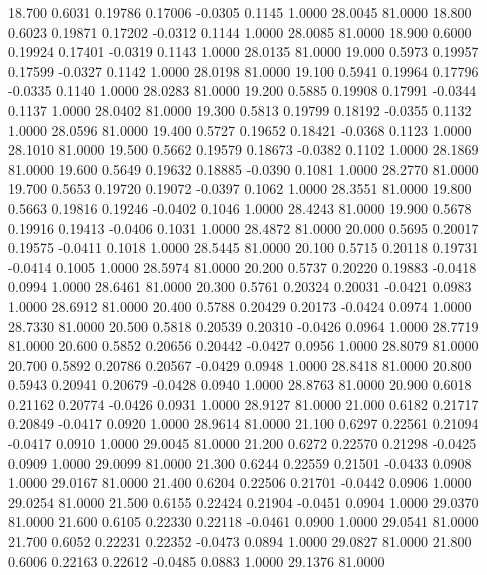   18.700   0.6031   0.19786   0.17006  -0.0305   0.1145   1.0000  28.0045  81.0000
  18.800   0.6023   0.19871   0.17202  -0.0312   0.1144   1.0000  28.0085  81.0000
  18.900   0.6000   0.19924   0.17401  -0.0319   0.1143   1.0000  28.0135  81.0000
  19.000   0.5973   0.19957   0.17599  -0.0327   0.1142   1.0000  28.0198  81.0000
  19.100   0.5941   0.19964   0.17796  -0.0335   0.1140   1.0000  28.0283  81.0000
  19.200   0.5885   0.19908   0.17991  -0.0344   0.1137   1.0000  28.0402  81.0000
  19.300   0.5813   0.19799   0.18192  -0.0355   0.1132   1.0000  28.0596  81.0000
  19.400   0.5727   0.19652   0.18421  -0.0368   0.1123   1.0000  28.1010  81.0000
  19.500   0.5662   0.19579   0.18673  -0.0382   0.1102   1.0000  28.1869  81.0000
  19.600   0.5649   0.19632   0.18885  -0.0390   0.1081   1.0000  28.2770  81.0000
  19.700   0.5653   0.19720   0.19072  -0.0397   0.1062   1.0000  28.3551  81.0000
  19.800   0.5663   0.19816   0.19246  -0.0402   0.1046   1.0000  28.4243  81.0000
  19.900   0.5678   0.19916   0.19413  -0.0406   0.1031   1.0000  28.4872  81.0000
  20.000   0.5695   0.20017   0.19575  -0.0411   0.1018   1.0000  28.5445  81.0000
  20.100   0.5715   0.20118   0.19731  -0.0414   0.1005   1.0000  28.5974  81.0000
  20.200   0.5737   0.20220   0.19883  -0.0418   0.0994   1.0000  28.6461  81.0000
  20.300   0.5761   0.20324   0.20031  -0.0421   0.0983   1.0000  28.6912  81.0000
  20.400   0.5788   0.20429   0.20173  -0.0424   0.0974   1.0000  28.7330  81.0000
  20.500   0.5818   0.20539   0.20310  -0.0426   0.0964   1.0000  28.7719  81.0000
  20.600   0.5852   0.20656   0.20442  -0.0427   0.0956   1.0000  28.8079  81.0000
  20.700   0.5892   0.20786   0.20567  -0.0429   0.0948   1.0000  28.8418  81.0000
  20.800   0.5943   0.20941   0.20679  -0.0428   0.0940   1.0000  28.8763  81.0000
  20.900   0.6018   0.21162   0.20774  -0.0426   0.0931   1.0000  28.9127  81.0000
  21.000   0.6182   0.21717   0.20849  -0.0417   0.0920   1.0000  28.9614  81.0000
  21.100   0.6297   0.22561   0.21094  -0.0417   0.0910   1.0000  29.0045  81.0000
  21.200   0.6272   0.22570   0.21298  -0.0425   0.0909   1.0000  29.0099  81.0000
  21.300   0.6244   0.22559   0.21501  -0.0433   0.0908   1.0000  29.0167  81.0000
  21.400   0.6204   0.22506   0.21701  -0.0442   0.0906   1.0000  29.0254  81.0000
  21.500   0.6155   0.22424   0.21904  -0.0451   0.0904   1.0000  29.0370  81.0000
  21.600   0.6105   0.22330   0.22118  -0.0461   0.0900   1.0000  29.0541  81.0000
  21.700   0.6052   0.22231   0.22352  -0.0473   0.0894   1.0000  29.0827  81.0000
  21.800   0.6006   0.22163   0.22612  -0.0485   0.0883   1.0000  29.1376  81.0000
